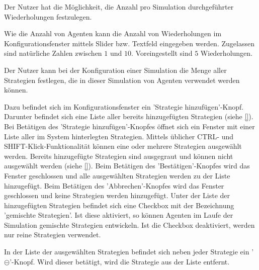 \documentclass[parskip=full,11pt,twoside]{scrartcl}
\begin{document}
Der Nutzer hat die Möglichkeit, die Anzahl pro Simulation durchgeführter Wiederholungen festzulegen.

Wie die Anzahl von Agenten kann die Anzahl von Wiederholungen im Konfigurationsfenster mittels Slider bzw. Textfeld eingegeben werden. Zugelassen sind natürliche Zahlen zwischen \(1\) und \(10\). Voreingestellt sind \(5\) Wiederholungen.

Der Nutzer kann bei der Konfiguration einer Simulation die Menge aller Strategien festlegen, die in dieser Simulation von Agenten verwendet werden können.

Dazu befindet sich im Konfigurationsfenster ein 'Strategie hinzufügen'-Knopf. Darunter befindet sich eine Liste aller bereits hinzugefügten Strategien (siehe \cref{}). Bei Betätigen des 'Strategie hinzufügen'-Knopfes öffnet sich ein Fenster mit einer Liste aller im System hinterlegten Strategien. Mittels üblicher \textsf{CTRL}- und \textsf{SHIFT}-Klick-Funktionalität können eine oder mehrere Strategien ausgewählt werden. Bereits hinzugefügte Strategien sind ausgegraut und können nicht ausgewählt werden (siehe \cref{}). Beim Betätigen des 'Bestätigen'-Knopfes wird das Fenster geschlossen und alle ausgewählten Strategien werden zu der Liste hinzugefügt. Beim Betätigen des 'Abbrechen'-Knopfes wird das Fenster geschlossen und keine Strategien werden hinzugefügt. Unter der Liste der hinzugefügten Strategien befindet sich eine Checkbox mit der Bezeichnung 'gemischte Strategien'. Ist diese aktiviert, so können Agenten im Laufe der Simulation gemischte Strategien entwickeln. Ist die Checkbox deaktiviert, werden nur reine Strategien verwendet.

In der Liste der ausgewählten Strategien befindet sich neben jeder Strategie ein '\(\circleddash\)'-Knopf. Wird dieser betätigt, wird die Strategie aus der Liste entfernt.
\end{document}
